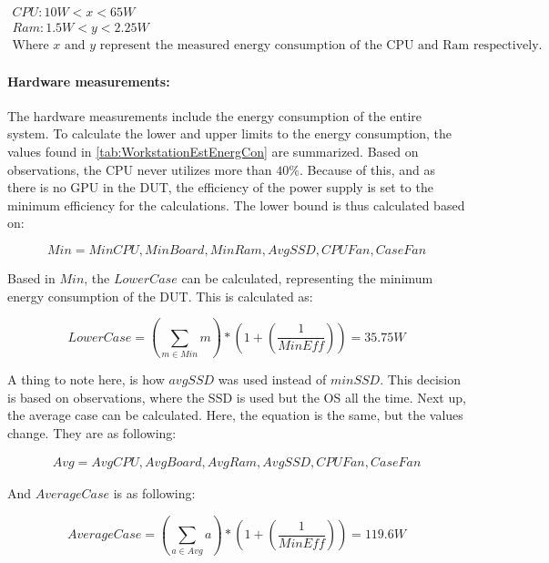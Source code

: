 \begin{gather*}
    CPU: 10W < x < 65W \\
    Ram: 1.5W < y < 2.25W \\
    \text{Where $x$ and $y$ represent the measured energy consumption of the CPU and Ram respectively.}
\end{gather*}

\paragraph{Hardware measurements:} The hardware measurements include the energy consumption of the entire system. To calculate the lower and upper limits to the energy consumption, the values found in \cref{tab:WorkstationEstEnergCon} are summarized. Based on observations, the CPU never utilizes more than $40\%$. Because of this, and as there is no GPU in the DUT, the efficiency of the power supply is set to the minimum efficiency for the calculations. The lower bound is thus calculated based on:

\begin{equation}
    Min = {MinCPU, MinBoard, MinRam, AvgSSD, CPUFan, CaseFan}
\end{equation}

Based in $Min$, the $LowerCase$ can be calculated, representing the minimum energy consumption of the DUT. This is calculated as:

\begin{equation}
    LowerCase = \left ( \sum_{m \in Min} m \right ) * \left (1 + \left ( \frac{1}{MinEff} \right ) \right ) = 35.75W
\end{equation}

A thing to note here, is how $avgSSD$ was used instead of $minSSD$. This decision is based on observations, where the SSD is used but the OS all the time. Next up, the average case can be calculated. Here, the equation is the same, but the values change. They are as following:

\begin{eqnarray}
    Avg = {AvgCPU, AvgBoard, AvgRam, AvgSSD, CPUFan, CaseFan}
\end{eqnarray}

And $AverageCase$ is as following:

\begin{equation}
    AverageCase = \left ( \sum_{a \in Avg} a \right ) * \left (1 + \left ( \frac{1}{MinEff} \right ) \right ) = 119.6W
\end{equation}

